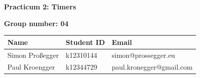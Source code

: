 \documentclass[11pt,a4paper]{article}
\begin{document}
\begin{center}
    {\LARGE \bfseries Practicum 2: Timers}
\end{center}

\vspace{0.5cm}
\textbf{Group number: 04 }

\begin{table}[h]
    \centering
    \begin{tabularx}{\textwidth}{|X|X|X|}
        \hline
        \centering \textbf{Name} & \centering \textbf{Student ID} & \centering \textbf{Email} \tabularnewline \hline
        Simon Proßegger & k12310144 & simon@prossegger.eu \tabularnewline \hline
        Paul Kroengger & k12344729 & paul.kronegger@gmail.com \tabularnewline \hline
    \end{tabularx}
\end{table}


\newpage

\newpage

\newpage

\newpage
\end{document}
